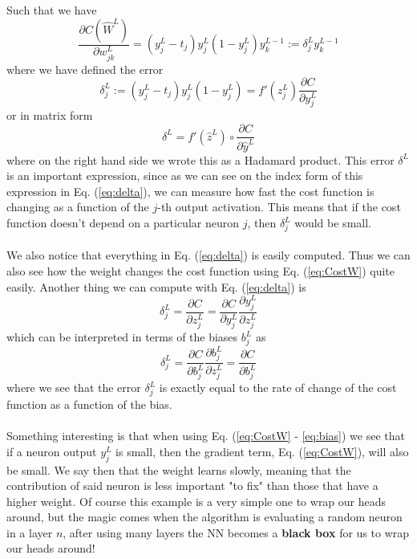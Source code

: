 \documentclass[14pt, a4paper]{book}
\begin{document}
Such that we have
\begin{equation}\label{eq:CostW}
    \frac{\partial C(\hat W ^L) }{\partial w_{jk}^L}=\left(y_j^L-t_j\right)y_j^L(1-y_j^L)y_k^{L-1} :=\delta_j^Ly_k^{L-1}
\end{equation}
where we have defined the error
\begin{equation}\label{eq:delta}
    \delta_j^L:=\left(y_j^L-t_j\right)y_j^L(1-y_j^L)=f'(z_j^L)\frac{\partial C}{\partial y_j^L} 
\end{equation}
or in matrix form
$$
\delta^L = f'(\hat z ^L)\circ \frac{\partial C}{\partial \hat y ^L}
$$
where on the right hand side we wrote this as a Hadamard product. This error $\delta^L$ is an important expression, since as we can see on the index form of this expression in Eq. (\ref{eq:delta}), we can measure how fast 
the cost function is changing as a function of the $j$-th output activation. This means that if the cost function doesn't depend on a particular neuron $j$, then $\delta_j^L$ would be small.  \\
\\We also notice that everything in Eq. (\ref{eq:delta}) is easily computed. Thus we can also see how the weight changes the cost function using Eq. (\ref{eq:CostW}) quite easily. 
Another thing we can compute with Eq. (\ref{eq:delta}) is
$$
\delta_j^L=\frac{\partial C}{\partial z_j^L} =\frac{\partial C}{\partial y_j^L}\frac{\partial y_j^L}{\partial z_j^L}
$$
which can be interpreted in terms of the biases $b_j^L$ as
\begin{equation}\label{eq:bias}
    \delta_j^L=\frac{\partial C}{\partial b_j^L}\frac{\partial b_j^L}{\partial z_j^L} = \frac{\partial C}{\partial b_j^L} 
\end{equation}
where we see that the error $\delta_j^L$ is exactly equal to the rate of change of the cost function as a function of the bias.\\
\\Something interesting is that when using Eq. (\ref{eq:CostW} - \ref{eq:bias}) we see that if a neuron output $y_j^L$ is small, then the gradient term, Eq. (\ref{eq:CostW}), will also be small. We say then that the weight learns 
slowly, meaning that the contribution of said neuron is less important "to fix" than those that have a higher weight. Of course this example is a very simple one to wrap our heads around, but the magic comes when the algorithm is 
evaluating a random neuron in a layer $n$, after using many layers the NN becomes a \textbf{black box} for us to wrap our heads around!\\
\end{document}
